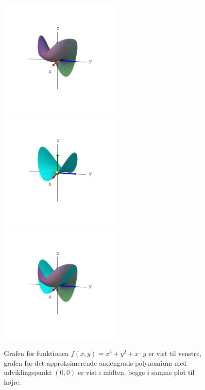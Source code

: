 \begin{figure}[ht]
\centerline{ \includegraphics[height=60mm]{plotVar2Fig3.pdf}  \includegraphics[height=60mm]{plotVar2App3.pdf}\includegraphics[height=60mm]{plotVar2FigApp3.pdf}  }
\begin{center}
\caption{Grafen for funktionen $f(x,y)= x^{3} + y^{2} + x\cdot y$ er vist til venstre, grafen for det approksimerende andengrads-polynomium med udviklingspunkt $(0,0)$ er vist i midten, begge i samme plot til højre.} \label{figPosHess3}
\end{center}
\end{figure}

